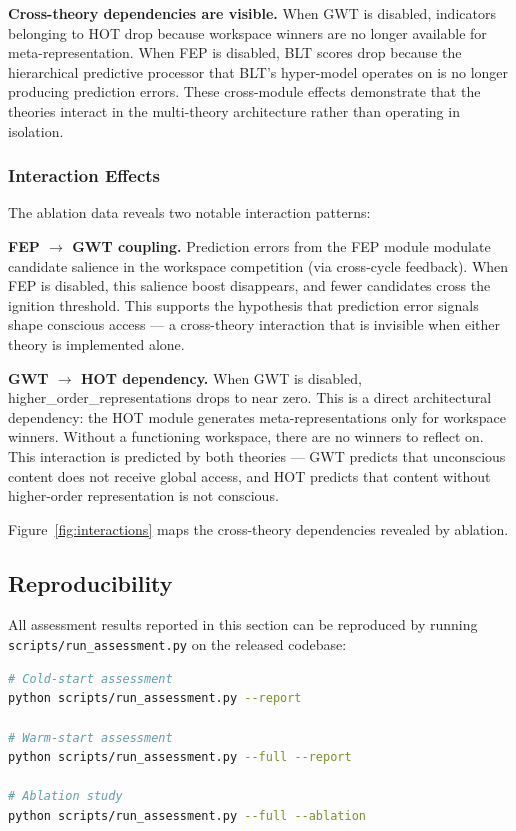 \textbf{Cross-theory dependencies are visible.} When GWT is disabled, indicators belonging to HOT drop because workspace winners are no longer available for meta-representation. When FEP is disabled, BLT scores drop because the hierarchical predictive processor that BLT's hyper-model operates on is no longer producing prediction errors. These cross-module effects demonstrate that the theories interact in the multi-theory architecture rather than operating in isolation.

\subsubsection{Interaction Effects}

The ablation data reveals two notable interaction patterns:

\textbf{FEP $\rightarrow$ GWT coupling.} Prediction errors from the FEP module modulate candidate salience in the workspace competition (via cross-cycle feedback). When FEP is disabled, this salience boost disappears, and fewer candidates cross the ignition threshold. This supports the hypothesis that prediction error signals shape conscious access --- a cross-theory interaction that is invisible when either theory is implemented alone.

\textbf{GWT $\rightarrow$ HOT dependency.} When GWT is disabled, higher\_order\_representations drops to near zero. This is a direct architectural dependency: the HOT module generates meta-representations only for workspace winners. Without a functioning workspace, there are no winners to reflect on. This interaction is predicted by both theories --- GWT predicts that unconscious content does not receive global access, and HOT predicts that content without higher-order representation is not conscious.

Figure~\ref{fig:interactions} maps the cross-theory dependencies revealed by ablation.



\subsection{Reproducibility}
\label{sec:reproducibility}

All assessment results reported in this section can be reproduced by running \texttt{scripts/run\_assessment.py} on the released codebase:

\begin{lstlisting}[language=bash]
# Cold-start assessment
python scripts/run_assessment.py --report

# Warm-start assessment
python scripts/run_assessment.py --full --report

# Ablation study
python scripts/run_assessment.py --full --ablation
\end{lstlisting}

